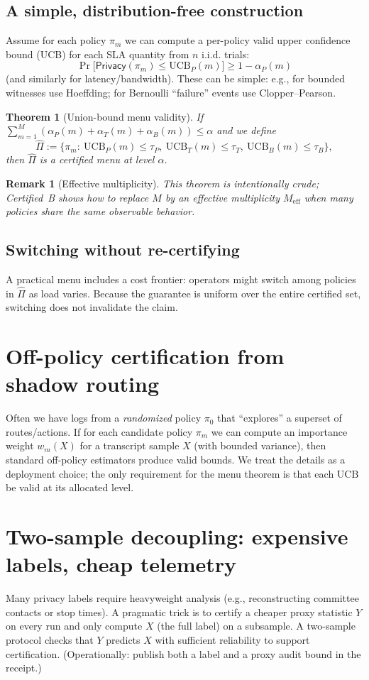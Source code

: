 \documentclass[11pt]{article}
\newtheorem{theorem}{Theorem}
\newtheorem{remark}{Remark}
\begin{document}
\subsection{A simple, distribution-free construction}
Assume for each policy $\pi_m$ we can compute a per-policy valid upper confidence bound (UCB) for each SLA quantity from $n$ i.i.d. trials:
\[
\Pr\big[\textsf{Privacy}(\pi_m)\le \mathrm{UCB}_P(m)\big]\ge 1-\alpha_P(m)
\]
(and similarly for latency/bandwidth).
These can be simple: e.g., for bounded witnesses use Hoeffding; for Bernoulli ``failure'' events use Clopper--Pearson.

\begin{theorem}[Union-bound menu validity]
If $\sum_{m=1}^M (\alpha_P(m)+\alpha_T(m)+\alpha_B(m))\le \alpha$ and we define
\[
\widehat\Pi := \{\pi_m:\ \mathrm{UCB}_P(m)\le \tau_P,\ \mathrm{UCB}_T(m)\le \tau_T,\ \mathrm{UCB}_B(m)\le \tau_B\},
\]
then $\widehat\Pi$ is a certified menu at level $\alpha$.
\end{theorem}

\begin{remark}[Effective multiplicity]
This theorem is intentionally crude; Certified~B shows how to replace $M$ by an effective multiplicity $M_{\mathrm{eff}}$ when many policies share the same observable behavior.
\end{remark}

\subsection{Switching without re-certifying}
A practical menu includes a cost frontier:
operators might switch among policies in $\widehat\Pi$ as load varies.
Because the guarantee is uniform over the entire certified set, switching does not invalidate the claim.

\section{Off-policy certification from shadow routing}
Often we have logs from a \emph{randomized} policy $\pi_0$ that ``explores'' a superset of routes/actions.
If for each candidate policy $\pi_m$ we can compute an importance weight $w_m(X)$ for a transcript sample $X$ (with bounded variance), then standard off-policy estimators produce valid bounds.
We treat the details as a deployment choice; the only requirement for the menu theorem is that each $\mathrm{UCB}$ be valid at its allocated level.

\section{Two-sample decoupling: expensive labels, cheap telemetry}
Many privacy labels require heavyweight analysis (e.g., reconstructing committee contacts or stop times).
A pragmatic trick is to certify a cheaper proxy statistic $Y$ on every run and only compute $X$ (the full label) on a subsample.
A two-sample protocol checks that $Y$ predicts $X$ with sufficient reliability to support certification.
(Operationally: publish both a label and a proxy audit bound in the receipt.)
\end{document}
